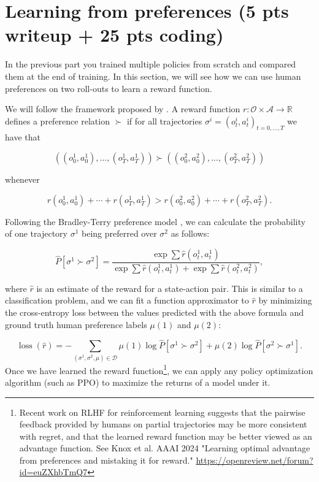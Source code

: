 \documentclass{article}
\begin{document}
\section{Learning from preferences (5 pts writeup + 25 pts coding)}

In the previous part you trained multiple policies from scratch and compared them at the end of training. In this section, we will see how we can use human preferences on two roll-outs to learn a reward function.

We will follow the framework proposed by \cite{NIPS2017_d5e2c0ad}. A reward function $r: \mathcal{O} \times \mathcal{A} \rightarrow \mathbb{R}$ defines a preference relation $\succ$ if for all trajectories $\sigma^i = (o^i_t,a^i_t)_{t=0,...,T}$ we have that

$$
\left(\left(o_0^1, a_0^1\right), \ldots,\left(o_{T}^1, a_{T}^1\right)\right) \succ\left(\left(o_0^2, a_0^2\right), \ldots,\left(o_{T}^2, a_{T}^2\right)\right)
$$

whenever

$$
r\left(o_0^1, a_0^1\right)+\cdots+r\left(o_{T}^1, a_{T}^1\right)>r\left(o_0^2, a_0^2\right)+\cdots+r\left(o_{T}^2, a_{T}^2\right) .
$$

Following the Bradley-Terry preference model \cite{19ff28b9-64f9-3656-ba40-08326a05748e}, we can calculate the probability of one trajectory $\sigma^1$ being preferred over $\sigma^2$ as follows:

$$
\hat{P}\left[\sigma^1 \succ \sigma^2\right]=\frac{\exp \sum \hat{r}\left(o_t^1, a_t^1\right)}{\exp \sum \hat{r}\left(o_t^1, a_t^1\right)+\exp \sum \hat{r}\left(o_t^2, a_t^2\right)},
$$

where $\hat{r}$ is an estimate of the reward for a state-action pair. This is similar to a classification problem, and we can fit a function approximator to $\hat{r}$ by minimizing the cross-entropy loss between the values predicted with the above formula and ground truth human preference labels $\mu(1)$ and $\mu(2)$:

$$
\operatorname{loss}(\hat{r})=-\sum_{\left(\sigma^1, \sigma^2, \mu\right) \in \mathcal{D}} \mu(1) \log \hat{P}\left[\sigma^1 \succ \sigma^2\right]+\mu(2) \log \hat{P}\left[\sigma^2 \succ \sigma^1\right] .
$$
%
Once we have learned the reward function\footnote{Recent work on RLHF for reinforcement learning suggests that the pairwise feedback provided by humans on partial trajectories may be more consistent with regret, and that the learned reward function may be better viewed as an advantage function. See Knox et al. AAAI 2024 "Learning optimal advantage from preferences and mistaking it for reward." \url{https://openreview.net/forum?id=euZXhbTmQ7}}, we can apply any policy optimization algorithm (such as PPO) to maximize the returns of a model under it.
\end{document}
